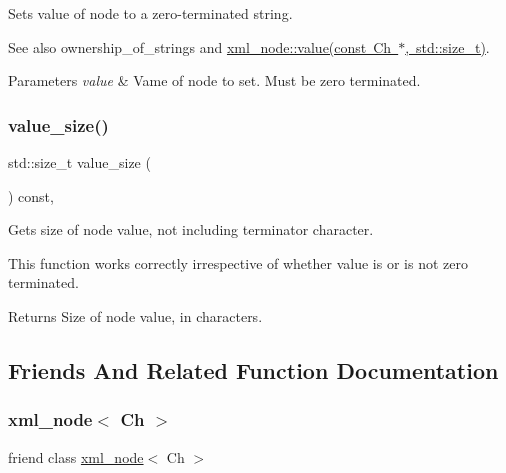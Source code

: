 Sets value of node to a zero-\/terminated string. 

See also ownership\+\_\+of\+\_\+strings and \mbox{\hyperlink{classrapidxml_1_1xml__base_ad9640aa3f5374673cb72a5289b6c91eb}{xml\+\_\+node\+::value(const Ch $\ast$, std\+::size\+\_\+t)}}. 
\begin{DoxyParams}{Parameters}
{\em value} & Vame of node to set. Must be zero terminated. \\
\hline
\end{DoxyParams}
\mbox{\label{classrapidxml_1_1xml__base_aa6981b3244607ea4ae7634f74f25361b}} 
\subsubsection{\texorpdfstring{value\+\_\+size()}{value\_size()}}
{\footnotesize\ttfamily std\+::size\+\_\+t value\+\_\+size (\begin{DoxyParamCaption}{ }\end{DoxyParamCaption}) const\hspace{0.3cm}{\ttfamily [inline]}, {\ttfamily [inherited]}}



Gets size of node value, not including terminator character. 

This function works correctly irrespective of whether value is or is not zero terminated. \begin{DoxyReturn}{Returns}
Size of node value, in characters. 
\end{DoxyReturn}


\subsection{Friends And Related Function Documentation}
\mbox{\label{classrapidxml_1_1xml__attribute_aa7e464ce3fe512598ff8dda47291941f}} 
\subsubsection{\texorpdfstring{xml\+\_\+node$<$ Ch $>$}{xml\_node< Ch >}}
{\footnotesize\ttfamily friend class \mbox{\hyperlink{classrapidxml_1_1xml__node}{xml\+\_\+node}}$<$ Ch $>$\hspace{0.3cm}{\ttfamily [friend]}}



